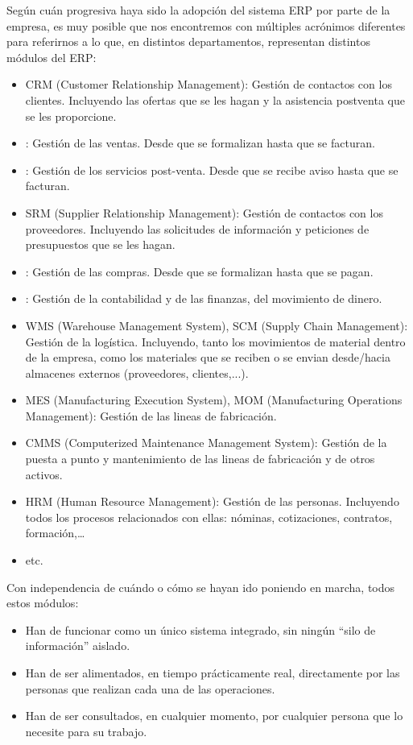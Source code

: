 \documentclass[spanish,12pt,a4paper,final,oneside]{book}
\begin{document}
Según cuán progresiva haya sido la adopción del sistema ERP por parte de la empresa, es muy posible que nos encontremos con múltiples acrónimos diferentes para referirnos a lo que, en distintos departamentos, representan distintos módulos del ERP:
\begin{itemize}
\item CRM (Customer Relationship Management): Gestión de contactos con los clientes. Incluyendo las ofertas que se les hagan y la asistencia postventa que se les proporcione.
\item : Gestión de las ventas. Desde que se formalizan hasta que se facturan.
\item : Gestión de los servicios post-venta. Desde que se recibe aviso hasta que se facturan.
\item SRM (Supplier Relationship Management): Gestión de contactos con los proveedores. Incluyendo las solicitudes de información y peticiones de presupuestos que se les hagan.
\item : Gestión de las compras. Desde que se formalizan hasta que se pagan.
\item : Gestión de la contabilidad y de las finanzas, del movimiento de dinero.
\item WMS (Warehouse Management System), SCM (Supply Chain Management): Gestión de la logística. Incluyendo, tanto los movimientos de material dentro de la empresa, como los materiales que se reciben o se envian desde/hacia almacenes externos (proveedores, clientes,...).
\item MES (Manufacturing Execution System), MOM (Manufacturing Operations Management): Gestión de las lineas de fabricación.
\item CMMS (Computerized Maintenance Management System): Gestión de la puesta a punto y mantenimiento de las lineas de fabricación y de otros activos.
\item HRM (Human Resource Management): Gestión de las personas. Incluyendo todos los procesos relacionados con ellas: nóminas, cotizaciones, contratos, formación,\ldots
\item etc.
\end{itemize}
Con independencia de cuándo o cómo se hayan ido poniendo en marcha, todos estos módulos:
\begin{itemize}
\item Han de funcionar como un único sistema integrado, sin ningún ``silo de información'' aislado. 
\item Han de ser alimentados, en tiempo prácticamente real, directamente por las personas que realizan cada una de las operaciones.
\item Han de ser consultados, en cualquier momento, por cualquier persona que lo necesite para su trabajo.
\end{itemize}
\end{document}
